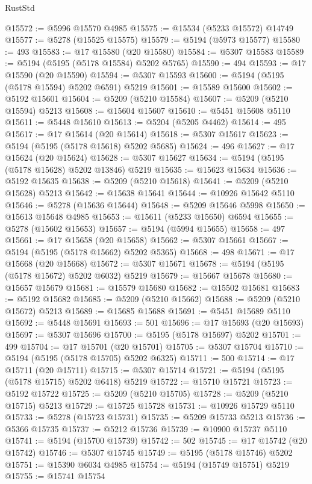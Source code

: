 \begin{lexlean}{RustStd}
\begin{coremodule}
@15572 := @5996 @15570 @4985
@15575 := @15534 (@5233 @15572) @14749
@15577 := @5278 (@15525 @15575)
@15579 := @5194 (@5973 @15577)
@15580 := 493
@15583 := @17 @15580 (@20 @15580)
@15584 := @5307 @15583
@15589 := @5194 (@5195 (@5178 @15584) @5202 @5765)
@15590 := 494
@15593 := @17 @15590 (@20 @15590)
@15594 := @5307 @15593
@15600 := @5194 (@5195 (@5178 @15594) @5202 @6591) @5219
@15601 := @15589 @15600
@15602 := @5192 @15601
@15604 := @5209 (@5210 @15584)
@15607 := @5209 (@5210 @15594) @5213
@15608 := @15604 @15607
@15610 := @5451 @15608 @5110
@15611 := @5448 @15610
@15613 := @5204 (@5205 @4462)
@15614 := 495
@15617 := @17 @15614 (@20 @15614)
@15618 := @5307 @15617
@15623 := @5194 (@5195 (@5178 @15618) @5202 @5685)
@15624 := 496
@15627 := @17 @15624 (@20 @15624)
@15628 := @5307 @15627
@15634 := @5194 (@5195 (@5178 @15628) @5202 @13846) @5219
@15635 := @15623 @15634
@15636 := @5192 @15635
@15638 := @5209 (@5210 @15618)
@15641 := @5209 (@5210 @15628) @5213
@15642 := @15638 @15641
@15644 := @10926 @15642 @5110
@15646 := @5278 (@15636 @15644)
@15648 := @5209 @15646 @5998
@15650 := @15613 @15648 @4985
@15653 := @15611 (@5233 @15650) @6594
@15655 := @5278 (@15602 @15653)
@15657 := @5194 (@5994 @15655)
@15658 := 497
@15661 := @17 @15658 (@20 @15658)
@15662 := @5307 @15661
@15667 := @5194 (@5195 (@5178 @15662) @5202 @5365)
@15668 := 498
@15671 := @17 @15668 (@20 @15668)
@15672 := @5307 @15671
@15678 := @5194 (@5195 (@5178 @15672) @5202 @6032) @5219
@15679 := @15667 @15678
@15680 := @15657 @15679
@15681 := @15579 @15680
@15682 := @15502 @15681
@15683 := @5192 @15682
@15685 := @5209 (@5210 @15662)
@15688 := @5209 (@5210 @15672) @5213
@15689 := @15685 @15688
@15691 := @5451 @15689 @5110
@15692 := @5448 @15691
@15693 := 501
@15696 := @17 @15693 (@20 @15693)
@15697 := @5307 @15696
@15700 := @5195 (@5178 @15697) @5202
@15701 := 499
@15704 := @17 @15701 (@20 @15701)
@15705 := @5307 @15704
@15710 := @5194 (@5195 (@5178 @15705) @5202 @6325)
@15711 := 500
@15714 := @17 @15711 (@20 @15711)
@15715 := @5307 @15714
@15721 := @5194 (@5195 (@5178 @15715) @5202 @6418) @5219
@15722 := @15710 @15721
@15723 := @5192 @15722
@15725 := @5209 (@5210 @15705)
@15728 := @5209 (@5210 @15715) @5213
@15729 := @15725 @15728
@15731 := @10926 @15729 @5110
@15733 := @5278 (@15723 @15731)
@15735 := @5209 @15733 @5213
@15736 := @5366 @15735
@15737 := @5212 @15736
@15739 := @10900 @15737 @5110
@15741 := @5194 (@15700 @15739)
@15742 := 502
@15745 := @17 @15742 (@20 @15742)
@15746 := @5307 @15745
@15749 := @5195 (@5178 @15746) @5202
@15751 := @15390 @6034 @4985
@15754 := @5194 (@15749 @15751) @5219
@15755 := @15741 @15754

\end{coremodule}
\end{lexlean}
